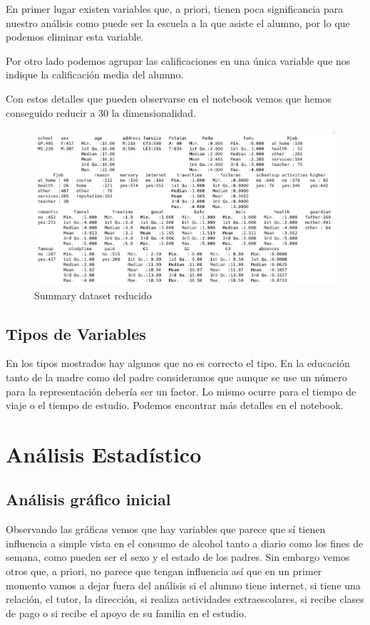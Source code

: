 \documentclass[12pt,a4paper]{article}
\begin{document}
En primer lugar existen variables que, a priori, tienen poca significancia para nuestro análisis como puede ser la escuela a la que asiste el alumno, por lo que podemos eliminar esta variable. 

Por otro lado podemos agrupar las calificaciones en una única variable que nos indique la calificación media del alumno. 

Con estos detalles que pueden observarse en el notebook vemos que hemos conseguido reducir a 30 la dimensionalidad.


\begin{figure}[ht!]
\centering
\includegraphics[trim = 0mm 0mm 0mm 0mm, clip,scale=0.4]{images/summary_nonas}
\caption{Summary dataset reducido}
\label{fig:sum3}
\end{figure}






\subsection{Tipos de Variables}
En los tipos mostrados hay algunos que no es correcto el tipo. En la educación tanto de la madre como del padre consideramos que aunque se use un número para la representación debería ser un factor. Lo mismo ocurre para el tiempo de viaje o el tiempo de estudio.  Podemos encontrar más detalles en el notebook. 

\section{Análisis Estadístico}
\subsection{Análisis gráfico inicial}
Observando las gráficas vemos que hay variables que parece que sí tienen influencia a simple vista en el consumo de alcohol tanto a diario como los fines de semana, como pueden ser el sexo y el estado de los padres. Sin embargo vemos otros que, a priori, no parece que tengan influencia así que en un primer momento vamos a dejar fuera del análisis si el alumno tiene internet, si tiene una relación, el tutor, la dirección, si realiza actividades extraescolares, si recibe clases de pago o si  recibe el apoyo de su familia en el estudio. 
\end{document}
